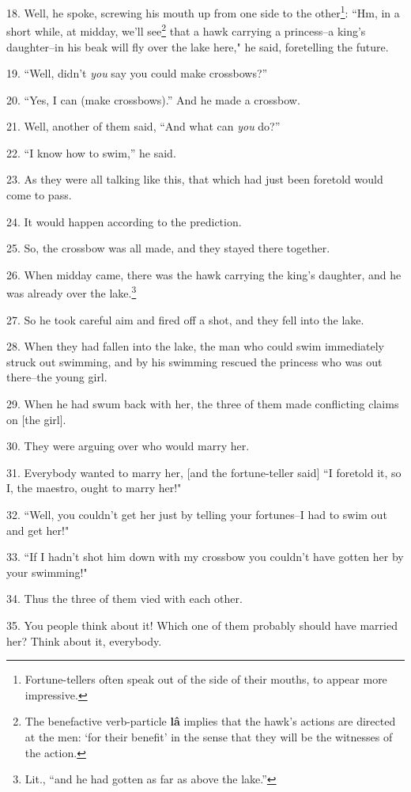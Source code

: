 18. Well, he spoke, screwing his mouth up from one side to the other\footnote{Fortune-tellers often speak out of the side of their mouths, to appear more impressive.}: ``Hm,
in a short while, at midday, we'll see\footnote{The benefactive verb-particle \textbf{lâ} implies that the hawk's actions are directed at the men: `for their benefit' in the sense that they will be the witnesses of the action.} that a hawk carrying a princess--a
king's daughter--in his beak will fly over the lake here," he said, foretelling
the future.

19. ``Well, didn't \textit{you} say you could make crossbows?''

20. ``Yes, I can (make crossbows).'' And he made a crossbow.

21. Well, another of them said, ``And what can \textit{you} do?''

22. ``I know how to swim,'' he said.

23. As they were all talking like this, that which had just been foretold would
come to pass.

24. It would happen according to the prediction.

25. So, the crossbow was all made, and they stayed there together.

26. When midday came, there was the hawk carrying the king's daughter, and he was
already over the lake.\footnote{Lit., ``and he had gotten as far as above the lake.''}

27. So he took careful aim and fired off a shot, and they fell into the lake.

28. When they had fallen into the lake, the man who could swim immediately struck
out swimming, and by his swimming rescued the princess who was out there--the young
girl.

29. When he had swum back with her, the three of them made conflicting claims on
[the girl].

30. They were arguing over who would marry her.

31. Everybody wanted to marry her, [and the fortune-teller said] ``I foretold
it, so I, the maestro, ought to marry her!"

32. ``Well, you couldn't get her just by telling your fortunes--I had to
swim out and get her!"

33. ``If I hadn't shot him down with my crossbow you couldn't have gotten
her by your swimming!"

34. Thus the three of them vied with each other.

35. You people think about it! Which one of them probably should have married her?
Think about it, everybody.

